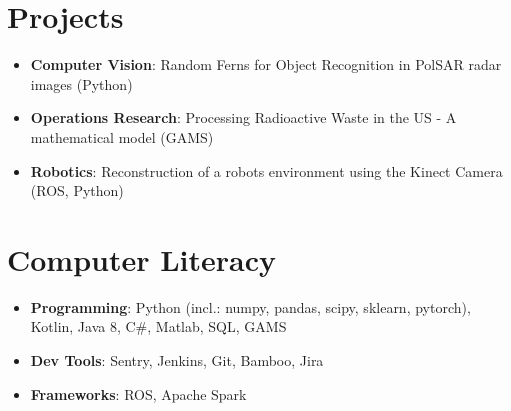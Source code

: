 \documentclass[letterpaper,11pt]{article}
\newcommand{\resumeSubHeadingListStart}{\begin{itemize}[leftmargin=*]}
\newcommand{\resumeSubHeadingListEnd}{\end{itemize}}
\begin{document}
\section{Projects}
  \resumeSubHeadingListStart
  	\item{\textbf{Computer Vision}: Random Ferns for Object Recognition in PolSAR radar images (Python)}
  	\vspace{-0.1in}
    \item{\textbf{Operations Research}: Processing Radioactive Waste in the US - A mathematical model (GAMS)}
    \vspace{-0.1in}
	\item{\textbf{Robotics}: Reconstruction of a robots environment using the Kinect Camera (ROS, Python)}
	\vspace{-0.1in}
\resumeSubHeadingListEnd

\section{Computer Literacy}
\resumeSubHeadingListStart
\item{\textbf{Programming}: Python (incl.: numpy, pandas, scipy, sklearn, pytorch), Kotlin, Java 8, C\#, Matlab, SQL, GAMS}
\vspace{-0.1in}
\item{\textbf{Dev Tools}: Sentry, Jenkins, Git, Bamboo, Jira}
\vspace{-0.1in}
\item{\textbf{Frameworks}: ROS, Apache Spark}
\vspace{-0.1in}
\resumeSubHeadingListEnd
\end{document}
